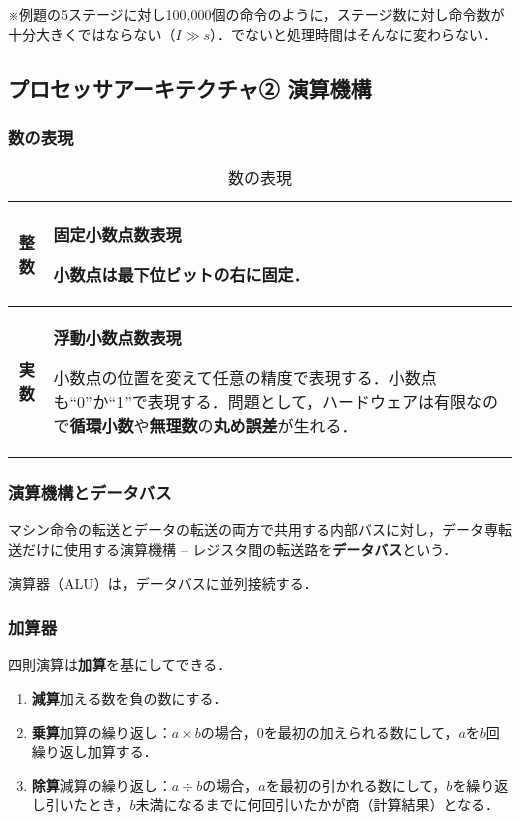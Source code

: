 \noindent
※例題の5ステージに対し100,000個の命令のように，ステージ数に対し命令数が十分大きくではならない（$I \gg s$）．でないと処理時間はそんなに変わらない．



\subsection{プロセッサアーキテクチャ② 演算機構}\label{sec:com_arch-2-C}
\baselineskip
\subsubsection{数の表現}\label{sec:com_arch-2-C-1}

\begin{table}[H]
	\caption{数の表現}
	\label{tab:com_arch-2}
	\centering
	\begin{tabular}{c|p{10cm}}
		\hline
		\textbf{整数} & \textbf{固定小数点数表現}\par 小数点は最下位ビットの右に固定．\\
		\hline
		\textbf{実数} & \textbf{浮動小数点数表現}\par 小数点の位置を変えて任意の精度で表現する．小数点も“0”か“1”で表現する．問題として，ハードウェアは有限なので\textbf{循環小数}や\textbf{無理数}の\textbf{丸め誤差}が生れる．\\
		\hline
	\end{tabular}
\end{table}



\subsubsection{演算機構とデータバス}\label{sec:com_arch-2-C-2}

マシン命令の転送とデータの転送の両方で共用する内部バスに対し，データ専転送だけに使用する演算機構 -- レジスタ間の転送路を\textbf{データバス}という．

演算器（ALU）は，データバスに並列接続する．



\subsubsection{加算器}\label{sec:com_arch-2-C-3}

四則演算は\textbf{加算}を基にしてできる．

\begin{enumerate}[label={\color{gray}●}, labelsep=10pt, leftmargin=23pt]
	\item \textbf{減算}\qquad 加える数を負の数にする．
	\item \textbf{乗算}\qquad 加算の繰り返し：$a \times b$の場合，$0$を最初の加えられる数にして，$a$を$b$回繰り返し加算する．
	\item \textbf{除算}\qquad 減算の繰り返し：$a \div b$の場合，$a$を最初の引かれる数にして，$b$を繰り返し引いたとき，$b$未満になるまでに何回引いたかが商（計算結果）となる．
\end{enumerate}


